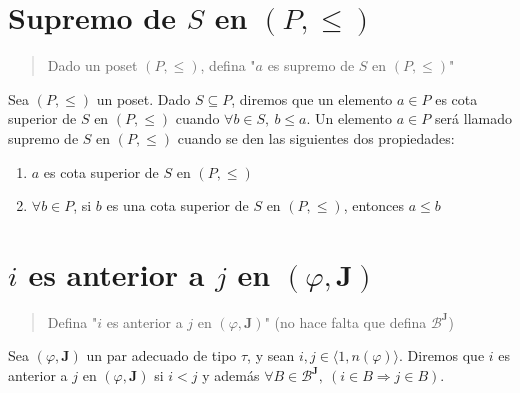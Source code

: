 \documentclass{article}
\begin{document}
\section{Supremo de $S$ en $(P,\leq)$}
\begin{quote}
  Dado un poset $(P,\leq)$, defina "$a$ es supremo de $S$ en $(P,\leq)$"
\end{quote}
Sea $(P,\leq)$ un poset. Dado $S\subseteq P$, diremos que un elemento $a\in P$ es cota superior de $S$ en $(P,\leq)$ cuando $\forall b\in S,\ b\leq a$.
\newline
Un elemento $a\in P$ será llamado supremo de $S$ en $(P,\leq)$ cuando se den las siguientes dos propiedades:
\begin{enumerate}
  \item $a$ es cota superior de $S$ en $(P,\leq)$
  \item $\forall b\in P$, si $b$ es una cota superior de $S$ en $(P,\leq)$, entonces $a\leq b$
\end{enumerate}

\section{$i$ es anterior a $j$ en $(\varphi,\mathbf{J})$}
\begin{quote}
  Defina "$i$ es anterior a $j$ en $(\varphi,\mathbf{J})$" (no hace falta que defina $\mathcal{B}^\mathbf{J}$)
\end{quote}
Sea $(\varphi,\mathbf{J})$ un par adecuado de tipo $\tau$, y sean $i,j\in\langle 1,n(\varphi)\rangle$. Diremos que $i$ es anterior a $j$ en $(\varphi,\mathbf{J})$ si $i<j$ y además $\forall B\in\mathcal{B}^\mathbf{J},\ (i\in B\Rightarrow j\in B)$.
\end{document}
